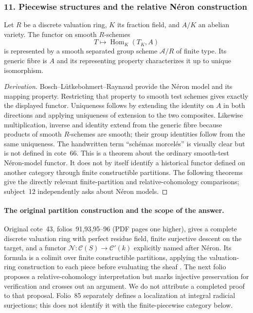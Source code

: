 \subsubsection{11. Piecewise structures and the relative N\'eron construction}
\begin{theorem}\label{B:subject11}
Let $R$ be a discrete valuation ring, $K$ its fraction field, and $A/K$ an abelian variety. The functor on smooth $R$-schemes
\[
 T\longmapsto\operatorname{Hom}_K(T_K,A)
\]
is represented by a smooth separated group scheme $\mathcal A/R$ of finite type. Its generic fibre is $A$ and its representing property characterizes it up to unique isomorphism.
\end{theorem}
\begin{proof}[Derivation]
Bosch--L\"utkebohmert--Raynaud \cite[\S1.3, Theorem 2; \S1.4, Theorem 3]{BBLR1990} provide the N\'eron model and its mapping property. Restricting that property to smooth test schemes gives exactly the displayed functor. Uniqueness follows by extending the identity on $A$ in both directions and applying uniqueness of extension to the two composites. Likewise multiplication, inverse and identity extend from the generic fibre because products of smooth $R$-schemes are smooth; their group identities follow from the same uniqueness. The handwritten term ``sch\'emas morcel\'es'' is visually clear but is not defined in cote~66. This is a theorem about the ordinary smooth-test N\'eron-model functor. It does not by itself identify a historical functor defined on another category through finite constructible partitions. The following theorems give the directly relevant finite-partition and relative-cohomology comparisons; subject~12 independently asks about N\'eron models.
\end{proof}

\paragraph{The original partition construction and the scope of the answer.}
Original cote~43, folios~91,93,95--96 (PDF pages one higher), gives a
complete discrete valuation ring with perfect residue field, finite
surjective descent on the target, and a functor
$\mathcal N:\mathcal C(S)\to\mathcal C'(k)$ explicitly named after
N\'eron. Its formula is a colimit over finite constructible partitions,
applying the valuation-ring construction to each piece before evaluating
the sheaf \cite[folio~95]{A567_GrothendieckCote43}.
The next folio proposes a relative-cohomology interpretation but marks
injective preservation for verification and crosses out an argument.
We do not attribute a completed proof to that proposal. Folio~85
separately defines a localization at integral radicial surjections;
this does not identify it with the finite-piecewise category below.

